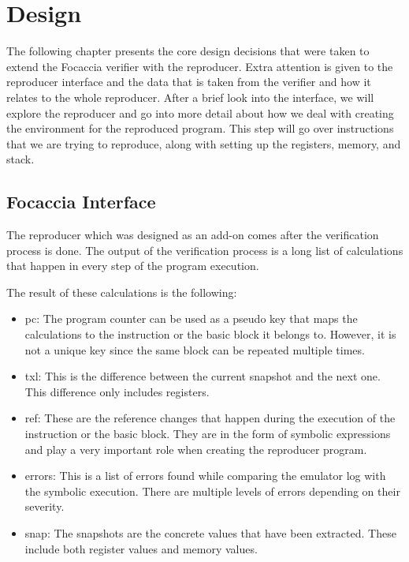 
\chapter{Design}\label{chapter:design}
The following chapter presents the core design decisions that were taken to extend the Focaccia verifier with the reproducer.
Extra attention is given to the reproducer interface and the data that is taken from the verifier and how it relates to the whole reproducer.
After a brief look into the interface, we will explore the reproducer and go into more detail about how we deal with creating the environment for the reproduced program.
This step will go over instructions that we are trying to reproduce, along with setting up the registers, memory, and stack.

\section{Focaccia Interface}
The reproducer which was designed as an add-on comes after the verification process is done.
The output of the verification process is a long list of calculations that happen in every step of the program execution.

The result of these calculations is the following:
\begin{itemize}
    \item pc: The program counter can be used as a pseudo key that maps the calculations to the instruction or the basic block it belongs to. However, it is not a unique key since the same block can be repeated multiple times.
    \item txl: This is the difference between the current snapshot and the next one. This difference only includes registers.
    \item ref: These are the reference changes that happen during the execution of the instruction or the basic block. They are in the form of symbolic expressions and play a very important role when creating the reproducer program.
    \item errors: This is a list of errors found while comparing the emulator log with the symbolic execution. There are multiple levels of errors depending on their severity.
    \item snap: The snapshots are the concrete values that have been extracted. These include both register values and memory values.
\end{itemize}


